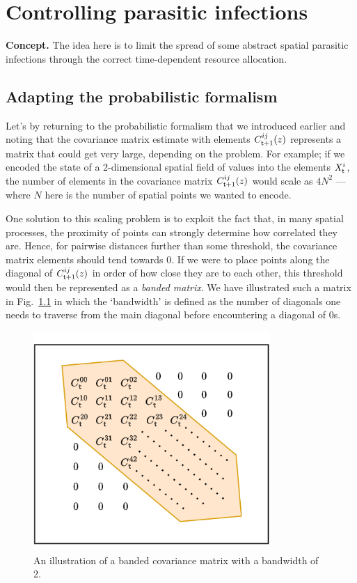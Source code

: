 \chapter{\sffamily Controlling parasitic infections}

{\bfseries\sffamily Concept.} The idea here is to limit the spread of some abstract spatial parasitic infections through the correct time-dependent resource allocation.

\section{\sffamily Adapting the probabilistic formalism}

Let's by returning to the probabilistic formalism that we introduced earlier and noting that the covariance matrix estimate with elements $C^{ij}_{{\sf t}+1}(z)$ represents a matrix that could get very large, depending on the problem. For example; if we encoded the state of a 2-dimensional spatial field of values into the elements $X^i_{\sf t}$, the number of elements in the covariance matrix $C^{ij}_{{\sf t}+1}(z)$ would scale as $4N^2$ --- where $N$ here is the number of spatial points we wanted to encode. 

One solution to this scaling problem is to exploit the fact that, in many spatial processes, the proximity of points can strongly determine how correlated they are. Hence, for pairwise distances further than some threshold, the covariance matrix elements should tend towards 0. If we were to place points along the diagonal of $C^{ij}_{{\sf t}+1}(z)$ in order of how close they are to each other, this threshold would then be represented as a \emph{banded matrix}. We have illustrated such a matrix in Fig.~\ref{fig:banded-matrix} in which the `bandwidth' is defined as the number of diagonals one needs to traverse from the main diagonal before encountering a diagonal of 0s.

\begin{figure}[h]
\centering
\includegraphics[width=9cm]{images/chapter-6-banded-matrix.drawio.png}
\caption{An illustration of a banded covariance matrix with a bandwidth of 2.}
\label{fig:banded-matrix}
\end{figure}

